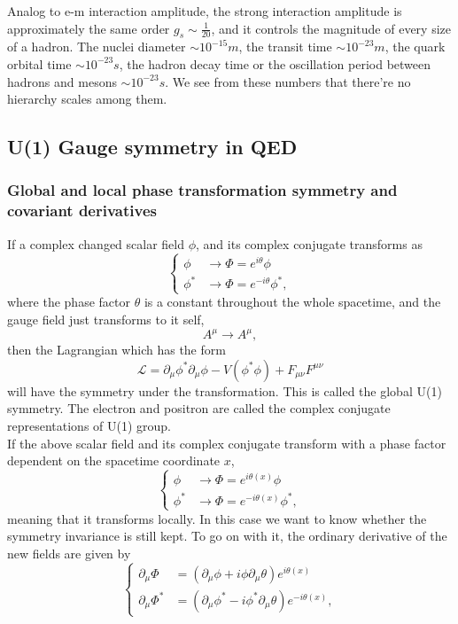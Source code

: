 \documentclass{article}
\newcommand{\be}{\begin{equation}}
\newcommand{\ee}{\end{equation}}
\newcommand{\p}{\partial}
\renewcommand{\1}{\left}
\renewcommand{\2}{\right}
\newcommand{\ma}{\mathcal}
\newcommand{\m}{\mu}
\newcommand{\n}{\nu}
\renewcommand{\th}{\theta}
\begin{document}
Analog to e-m interaction amplitude, the strong interaction amplitude is approximately the same order $g_s\sim \frac1 {20}$, and it controls the magnitude of every size of a hadron. The nuclei diameter $\sim 10^{-15}m$, the transit time $\sim 10^{-23}m$, the quark orbital time $\sim 10^{-23}s$, the hadron decay time or the oscillation period between hadrons and mesons $\sim 10^{-23}s$. We see from these numbers that there're no hierarchy scales among them.\\

\subsection{U(1) Gauge symmetry in QED}
\subsubsection{Global and local phase transformation symmetry and covariant derivatives}
If a complex changed scalar field $\phi$, and its complex conjugate transforms as
\be\1\{\begin{split}
\phi &\rightarrow \Phi=e^{i\th} \phi\\
\phi^* &\rightarrow \Phi=e^{-i\th} \phi^*,
\end{split}\2.\ee
where the phase factor $\th$ is a constant throughout the whole spacetime, and the gauge field just transforms to it self,
\be
A^\m \rightarrow A^\m,
\ee
then the Lagrangian which has the form 
\be \ma L=\p_\m \phi^*\p_\m \phi-V(\phi^*\phi)+F_{\m\n}F^{\m\n} \ee
will have the symmetry under the transformation. This is called the global U(1) symmetry. The electron and positron are called the complex conjugate representations of U(1) group.\\
If the above scalar field and its complex conjugate transform with a phase factor dependent on the spacetime coordinate $x$,
\be\1\{\begin{split}
\phi &\rightarrow \Phi=e^{i\th(x)} \phi\\
\phi^* &\rightarrow \Phi=e^{-i\th(x)} \phi^*,
\end{split}\2.\ee
meaning that it transforms locally. In this case we want to know whether the symmetry invariance is still kept. To go on with it, the ordinary derivative of the new fields are given by
\be\1\{\begin{split}
\p_\m\Phi&=\1(\p_\m\phi+i\phi\p_\m\th\2)e^{i\th(x)} \\
\p_\m\Phi^*&=\1(\p_\m\phi^*-i\phi^*\p_\m\th\2)e^{-i\th(x)},
\end{split}\2.\ee
\end{document}
